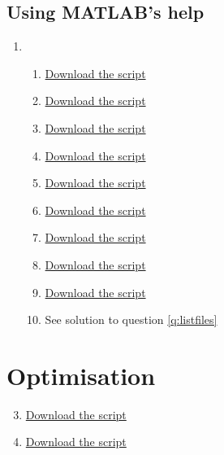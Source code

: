 \documentclass{article}
\begin{document}
	\subsection*{Using MATLAB's help}
	\begin{enumerate}[resume]
		\item 
		\begin{enumerate} 
			\item \href{https://github.com/UoMResearchIT/MATLAB-online-exercises/raw/master/lesson6_mfiles/q3a.m}{Download the script}
			
			\item \href{https://github.com/UoMResearchIT/MATLAB-online-exercises/raw/master/lesson6_mfiles/q3b.m}{Download the script}
			
			\item \href{https://github.com/UoMResearchIT/MATLAB-online-exercises/raw/master/lesson6_mfiles/q3c.m}{Download the script}
						
			\item \href{https://github.com/UoMResearchIT/MATLAB-online-exercises/raw/master/lesson6_mfiles/q3d.m}{Download the script}
			
			\item \href{https://github.com/UoMResearchIT/MATLAB-online-exercises/raw/master/lesson6_mfiles/q3d_test.m}{Download the script}
			
			\item \href{https://github.com/UoMResearchIT/MATLAB-online-exercises/raw/master/lesson6_mfiles/q3e.m}{Download the script}
			
			
			
			\item \href{https://github.com/UoMResearchIT/MATLAB-online-exercises/raw/master/lesson6_mfiles/btokb.m}{Download the script}
			
			\item \href{https://github.com/UoMResearchIT/MATLAB-online-exercises/raw/master/lesson6_mfiles/q3g.m}{Download the script}
			
			\item \href{https://github.com/UoMResearchIT/MATLAB-online-exercises/raw/master/lesson6_mfiles/listfiles.m}{Download the script}
			\label{q:listfiles}
			
			\item See solution to question \ref{q:listfiles}
		\end{enumerate}
	\end{enumerate}
	\section{Optimisation}
	\begin{enumerate}
		\setcounter{enumi}{2}
		\item \href{https://github.com/UoMResearchIT/MATLAB-online-exercises/raw/master/lesson6_mfiles/loopy_editor_suggestions.m}{Download the script}	
		\item \href{https://github.com/UoMResearchIT/MATLAB-online-exercises/raw/master/lesson6_mfiles/fast_loopy.m}{Download the script}	
	\end{enumerate}

				
\end{document}
